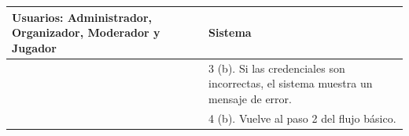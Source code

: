 \begin{center}
\begin{tabular}{| p{7.5cm} | p{7.5cm} |}
    \multicolumn{1}{|p{7.5cm}|}{\textbf{Usuarios:} Administrador, Organizador, Moderador y Jugador} & \multicolumn{1}{|p{7.5cm}|}{\textbf{Sistema}} \\ \hline
    
    \multicolumn{1}{|p{7.5cm}|}{} & 
    \multicolumn{1}{|p{7.5cm}|}{3 (b). Si las credenciales son incorrectas, el sistema muestra un mensaje de error.}\\ \hline
    
    \multicolumn{1}{|p{7.5cm}|}{} & 
    \multicolumn{1}{|p{7.5cm}|}{4 (b). Vuelve al paso 2 del flujo básico.}\\ \hline
  \end{tabular}
  
  \label{table:usecase:1}
\end{center}

%
%

